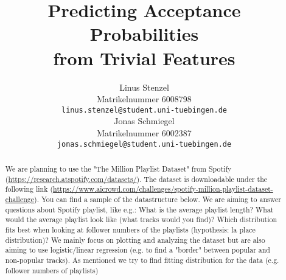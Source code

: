 \documentclass{article}
\title{Predicting Acceptance Probabilities\\ from Trivial Features}
\author{
  Linus Stenzel\\
  Matrikelnummer 6008798\\
  \texttt{linus.stenzel@student.uni-tuebingen.de} \\
  \And
  Jonas Schmiegel\\
  Matrikelnummer 6002387\\
  \texttt{jonas.schmiegel@student.uni-tuebingen.de} \\
}
\begin{document}
\maketitle

\begin{abstract}
  We are planning to use the "The Million Playlist Dataset" from Spotify (\url{https://research.atspotify.com/datasets/}). The dataset is downloadable under the following link (\url{https://www.aicrowd.com/challenges/spotify-million-playlist-dataset-challenge}). You can find a sample of the datastructure below.
  We are aiming to answer questions about Spotify playlist, like e.g.: What is the average playlist length? What would the average playlist look like (what tracks would you find)? Which distribution fits best when looking at follower numbers of the playlists (hypothesis: la place distribution)? 
  We mainly focus on plotting and analyzing the dataset but are also aiming to use logistic/linear regression (e.g. to find a "border" between popular and non-popular tracks). As mentioned we try to find fitting distribution for the data (e.g. follower numbers of playlists)
\end{abstract}





% 

\end{document}

